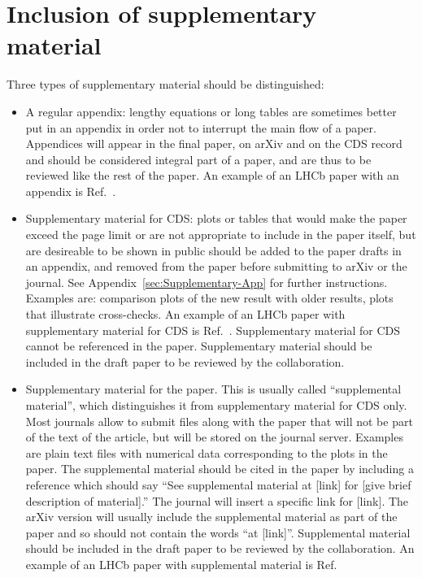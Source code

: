 \section{Inclusion of supplementary material}
\label{sec:Supplementary}

Three types of supplementary material should be distinguished:
\begin{itemize}
\item{A regular appendix: lengthy equations or long tables are sometimes
better put in an appendix in order not to interrupt the main flow of a paper.
Appendices will appear in the final paper, on arXiv
and on the CDS record and should be considered integral
part of a paper, and are thus to be reviewed like the rest of the paper.
An example of an LHCb paper with an appendix is Ref.~\cite{LHCb-PAPER-2013-070}.
}
\item{Supplementary material for CDS: plots or tables that 
would make the paper exceed the page limit or are
not appropriate to include in the paper itself,
but are desireable to be shown in public
should be added to the paper drafts in an appendix, and
removed from the paper before submitting to arXiv or the journal.
See Appendix~\ref{sec:Supplementary-App} for further instructions.
Examples are: comparison plots of the new result with older results,
plots that illustrate cross-checks.
An example of an LHCb paper with supplementary material for CDS 
is Ref.~\cite{LHCb-PAPER-2013-035}.
Supplementary material for CDS cannot be referenced in the paper.
Supplementary material should be included in the draft paper to be
reviewed by the collaboration.
}
\item{Supplementary material for the paper. This is usually called ``supplemental material'', which distinguishes it from supplementary material for CDS only. Most journals allow
to submit files along with the paper that will not be part of the
text of the article, but will be stored on the journal server.
Examples are plain text files with numerical data corresponding to the plots
in the paper. 
The supplemental material should be cited in the paper by including a reference
which should say ``See supplemental material at [link] for [give brief description of material].''
The journal will insert a specific link for [link]. The arXiv version will usually include the supplemental material as part of the paper and so should not contain the words ``at [link]''.
Supplemental material should be included in the draft paper to be
reviewed by the collaboration.
An example of an LHCb paper with supplemental material 
is Ref.~\cite{LHCb-PAPER-2015-029}
}
\end{itemize}

